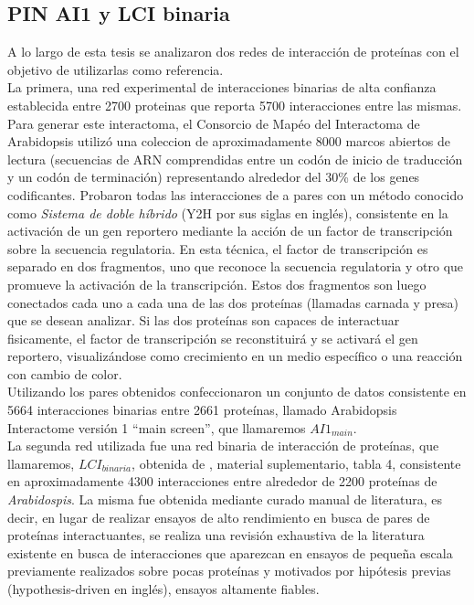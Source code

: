 \subsection{PIN AI1 y LCI binaria}
A lo largo de esta tesis se analizaron dos redes de interacción de proteínas con el objetivo de utilizarlas como referencia.\\
La primera, una red experimental de interacciones binarias de alta confianza establecida entre 2700 proteinas \cite{Hahn2013} que reporta 5700 interacciones entre las mismas. Para generar este interactoma, el Consorcio de Mapéo del Interactoma de Arabidopsis utilizó una coleccion de aproximadamente 8000 marcos abiertos de lectura (secuencias de ARN comprendidas entre un codón de inicio de traducción y un codón de terminación) representando alrededor del 30\% de los genes codificantes. Probaron todas las interacciones de a pares con un método conocido como \textit{Sistema de doble híbrido} (Y2H por sus siglas en inglés), consistente en la activación de un gen reportero mediante la acción de un factor de transcripción sobre la secuencia regulatoria. En esta técnica, el factor de transcripción es separado en dos fragmentos, uno que reconoce la secuencia regulatoria y otro que promueve la activación de la transcripción. Estos dos fragmentos son luego conectados cada uno a cada una de las dos proteínas (llamadas carnada y presa) que se desean analizar. Si las dos proteínas son capaces de interactuar fisicamente, el factor de transcripción se reconstituirá y se activará el gen reportero, visualizándose como crecimiento en un medio específico o una reacción con cambio de color.\cite{Bruckner2009}\\
Utilizando los pares obtenidos confeccionaron un conjunto de datos consistente en 5664 interacciones binarias entre 2661 proteínas, llamado Arabidopsis Interactome versión 1 ``main screen'', que llamaremos $AI1_{main}$.\\
La segunda red utilizada fue una red binaria de interacción de proteínas, que llamaremos, $LCI_{binaria}$, obtenida de \cite{Hahn2013}, material suplementario, tabla 4, consistente en aproximadamente 4300 interacciones entre alrededor de 2200 proteínas de \textit{Arabidospis}. La misma fue obtenida mediante curado manual de literatura, es decir, en lugar de realizar ensayos de alto rendimiento en busca de pares de proteínas interactuantes, se realiza una revisión exhaustiva de la literatura existente en busca de interacciones que aparezcan en ensayos de pequeña escala previamente realizados sobre pocas proteínas y motivados por hipótesis previas (hypothesis-driven en inglés), ensayos altamente fiables.\cite{Cusick2009}\\
